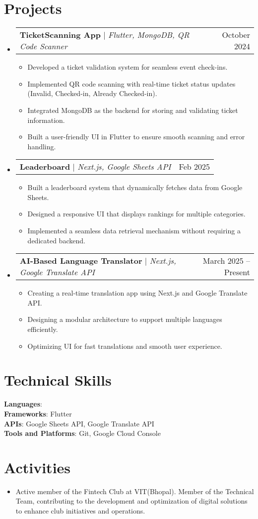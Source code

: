 \documentclass[letterpaper,11pt]{article}
\makeatletter
\newcommand{\resumeItem}[1]{
  \item\small{
    {#1 \vspace{-2pt}}
  }
}
\newcommand{\resumeProjectHeading}[2]{
    \item
    \begin{tabular*}{0.97\textwidth}{l@{\extracolsep{\fill}}r}
      \small#1 & #2 \\
    \end{tabular*}\vspace{-7pt}
}
\newcommand{\resumeSubHeadingListStart}{\begin{itemize}[leftmargin=0.15in, label={}]}
\newcommand{\resumeSubHeadingListEnd}{\end{itemize}}
\newcommand{\resumeItemListStart}{\begin{itemize}}
\newcommand{\resumeItemListEnd}{\end{itemize}\vspace{-5pt}}
\makeatother
\begin{document}
\section{Projects}
    \resumeSubHeadingListStart
      \resumeProjectHeading
          {\textbf{TicketScanning App} $|$ \emph{Flutter, MongoDB, QR Code Scanner}}{October 2024}
          \resumeItemListStart
            \resumeItem{Developed a ticket validation system for seamless event check-ins.}
            \resumeItem{Implemented QR code scanning with real-time ticket status updates (Invalid, Checked-in, Already Checked-in).}
            \resumeItem{Integrated MongoDB as the backend for storing and validating ticket information.}
            \resumeItem{Built a user-friendly UI in Flutter to ensure smooth scanning and error handling.}
          \resumeItemListEnd
      \resumeProjectHeading
          {\textbf{Leaderboard} $|$ \emph{Next.js, Google Sheets API}}{Feb 2025}
          \resumeItemListStart
            \resumeItem{Built a leaderboard system that dynamically fetches data from Google Sheets.}
            \resumeItem{Designed a responsive UI that displays rankings for multiple categories.}
            \resumeItem{Implemented a seamless data retrieval mechanism without requiring a dedicated backend.}
          \resumeItemListEnd
      \resumeProjectHeading
          {\textbf{AI-Based Language Translator} $|$ \emph{Next.js, Google Translate API}}{March 2025 -- Present}
          \resumeItemListStart
            \resumeItem{Creating a real-time translation app using Next.js and Google Translate API.}
            \resumeItem{Designing a modular architecture to support multiple languages efficiently.}
            \resumeItem{Optimizing UI for fast translations and smooth user experience.}
          \resumeItemListEnd
    \resumeSubHeadingListEnd

\section{Technical Skills}
 \begin{itemize}[leftmargin=0.15in, label={}]
    \small{\item{
     \textbf{Languages}{: } \\
     \textbf{Frameworks}{: Flutter} \\
     \textbf{APIs}{: Google Sheets API, Google Translate API} \\
     \textbf{Tools and Platforms}{: Git, Google Cloud Console}
    }}
 \end{itemize}

\section{Activities}
    \resumeItemListStart
        \resumeItem{Active member of the Fintech Club at VIT(Bhopal). Member of the Technical Team, contributing to the development and optimization of digital solutions to enhance club initiatives and operations.}
    \resumeItemListEnd
\end{document}

